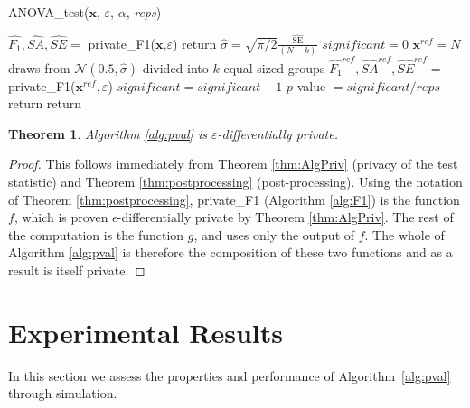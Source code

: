 \documentclass[USenglish,oneside]{article}
\newcounter{ab}
\newcounter{ar}
\newtheorem{theorem}{Theorem}
\newcommand{\dbsize}{\ensuremath{N}\xspace}
\newcommand{\eps}{\ensuremath{\varepsilon}\xspace}
\newcommand{\normal}{\ensuremath{\mathcal{N}}}
\newcommand{\se}{\textit{SE}\xspace}
\newcommand{\sa}{\textit{SA}\xspace}
\newcommand{\x}{\ensuremath{\mathbf{x}}\xspace}
\begin{document}
\begin{algorithm}
    \caption{ANOVA\_test($\x$, $\eps$, $\alpha$, \emph{reps})\label{alg:pval} }
    \begin{algorithmic}
        \STATE $\widehat{F_1}, \widehat{\sa}, \widehat{\se} =$ private\_F1($\x$,$\eps$)
        \STATE return 
        \ENDIF
        \STATE $\widehat{\sigma} = \sqrt{\pi/2}\frac{\widehat{\text{SE}}}{(\dbsize-k)}$
        \STATE $significant = 0$
        \STATE  $\x^{ref} = N$ draws from $\normal(0.5, \widehat{\sigma})$ divided into $k$ equal-sized groups
        \STATE $\widehat{F_1}^{ref}, \widehat{\sa}^{ref}, \widehat{\se}^{ref} =$ private\_F1($\x^{ref}, \eps$)
        \STATE $significant = significant + 1$
        \ENDIF
        \ENDFOR
        \STATE $p$-value $= significant/reps$
        \STATE return 
        \ELSE 
        \STATE return 
        \ENDIF
    \end{algorithmic}
\end{algorithm}


\begin{theorem} \label{thm:fullTestPriv}
Algorithm \ref{alg:pval} is \eps-differentially private.
\end{theorem}
\begin{proof}
This follows immediately from Theorem \ref{thm:AlgPriv} (privacy of the test statistic) and Theorem \ref{thm:postprocessing} (post-processing).  Using the notation of Theorem \ref{thm:postprocessing}, private\_F1 (Algorithm \ref{alg:F1}) is the function $f$, which is proven $\epsilon$-differentially private by Theorem \ref{thm:AlgPriv}.  The rest of the computation is the function $g$, and uses only the output of $f$.  The whole of Algorithm \ref{alg:pval} is therefore the composition of these two functions and as a result is itself private.
\end{proof}


\section{Experimental Results}
\label{sec:results}

In this section we assess the properties and performance of Algorithm~\ref{alg:pval} through simulation. 
\end{document}
